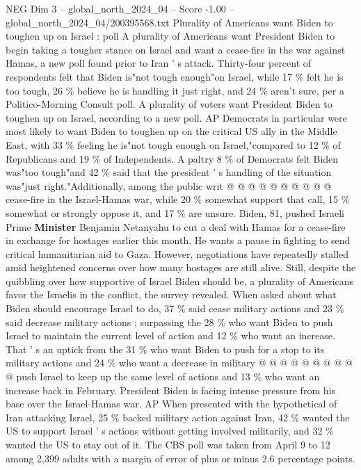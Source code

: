 \begin{textsample}{NEG Dim 3 – global\_north\_2024\_04 – Score -1.00 – global\_north\_2024\_04/200395568.txt}  \label{ex:f3_neg_384}
Plurality of Americans want Biden to toughen up on Israel : poll A plurality of Americans want President Biden to begin taking a tougher stance on Israel and want a cease-fire in the war against Hamas, a new poll found prior to Iran ' s attack.
Thirty-four percent of respondents felt that Biden is"not tough enough"on Israel, while 17 \% felt he is too tough, 26 \% believe he is handling it just right, and 24 \% aren't sure, per a Politico-Morning Consult poll.
A plurality of voters want President Biden to toughen up on Israel, according to a new poll.
AP Democrats in particular were most likely to want Biden to toughen up on the critical US ally in the Middle East, with 33 \% feeling he is"not tough enough on Israel,"compared to 12 \% of Republicans and 19 \% of Independents.
A paltry 8 \% of Democrats felt Biden was"too tough"and 42 \% said that the president ' s handling of the situation was"just right."Additionally, among the public writ @ @ @ @ @ @ @ @ @ @ cease-fire in the Israel-Hamas war, while 20 \% somewhat support that call, 15 \% somewhat or strongly oppose it, and 17 \% are unsure.
Biden, 81, pushed Israeli Prime \textbf{Minister} Benjamin Netanyahu to cut a deal with Hamas for a cease-fire in exchange for hostages earlier this month.
He wants a pause in fighting to send critical humanitarian aid to Gaza.
However, negotiations have repeatedly stalled amid heightened concerns over how many hostages are still alive.
Still, despite the quibbling over how supportive of Israel Biden should be, a plurality of Americans favor the Israelis in the conflict, the survey revealed.
When asked about what Biden should encourage Israel to do, 37 \% said cease military actions and 23 \% said decrease military actions ; surpassing the 28 \% who want Biden to push Israel to maintain the current level of action and 12 \% who want an increase.
That ' s an uptick from the 31 \% who want Biden to push for a stop to its military actions and 24 \% who want a decrease in military @ @ @ @ @ @ @ @ @ @ push Israel to keep up the same level of actions and 13 \% who want an increase back in February.
President Biden is facing intense pressure from his base over the Israel-Hamas war.
AP When presented with the hypothetical of Iran attacking Israel, 25 \% backed military action against Iran, 42 \% wanted the US to support Israel ' s actions without getting involved militarily, and 32 \% wanted the US to stay out of it.
The CBS poll was taken from April 9 to 12 among 2,399 adults with a margin of error of plus or minus 2.6 percentage points.

\end{textsample}
